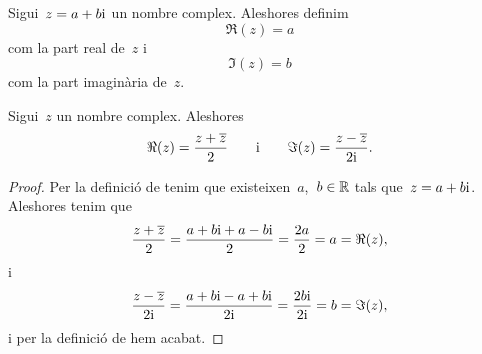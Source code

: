 \documentclass[../../main.tex]{subfiles}
\begin{document}
    \begin{definition}
        \label{def:part real i part imaginària d'un nombre complex}
        \label{def:part real d'un nombre complex}
        \label{def:part imaginària d'un nombre complex}
        Sigui~\(z = a+b\mathrm{i}\) un nombre complex.
        Aleshores definim
        \[
            \Re(z) = a
        \]
        com la part real de~\(z\) i
        \[
            \Im(z) = b
        \]
        com la part imaginària de~\(z\).
    \end{definition}
    \begin{proposition}
        \label{prop:fórmules per la part real i part imaginària d'un nombre complex}
        \label{prop:fórmula per la part real d'un nombre complex}
        \label{prop:fórmula per la part imaginària d'un nombre complex}
        Sigui~\(z\) un nombre complex.
        Aleshores
        \[
            \Re(z) = \frac{z+\overline{z}}{2}\qquad\text{i}\qquad\Im(z)
                   = \frac{z-\overline{z}}{2\mathrm{i}}.
        \]
        \begin{proof}
            Per la definició de  tenim que
            existeixen~\(a\),~\(b\in\mathbb{R}\) tals que~\(z = a+b\mathrm{i}\).
            Aleshores tenim que
            \[
                \frac{z+\overline{z}}{2} = \frac{a+b\mathrm{i}+a-b\mathrm{i}}{2}
                                         = \frac{2a}{2} = a = \Re(z),
            \]
            i
            \[
                \frac{z-\overline{z}}{2\mathrm{i}} = \frac{a+b\mathrm{i}-a+b\mathrm{i}}{2\mathrm{i}}
                                            = \frac{2b\mathrm{i}}{2\mathrm{i}} = b = \Im(z),
            \]
            i per la definició
            de  hem
            acabat.
        \end{proof}
    \end{proposition}
\end{document}
